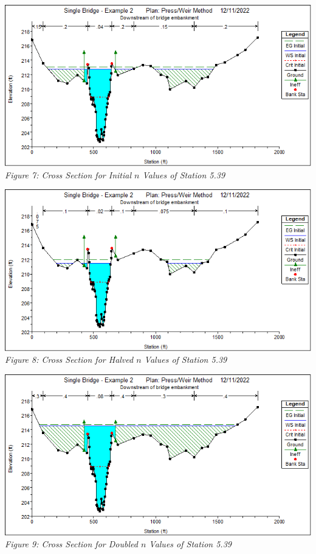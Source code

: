 \begin{center}
\newpage\begin{center}
    \includegraphics[scale=0.7, frame]{fig7.png}
    \\\emph{Figure 7: Cross Section for Initial $n$ Values of Station 5.39}\\
    \vspace{5mm}
    \includegraphics[scale=0.7, frame]{fig8.png}
    \\\emph{Figure 8: Cross Section for Halved $n$ Values of Station 5.39}\\
    \vspace{5mm}
    \includegraphics[scale=0.7, frame]{fig9.png}
    \\\emph{Figure 9: Cross Section for Doubled $n$ Values of Station 5.39}\\
\end{center}\newpage


\end{center}
